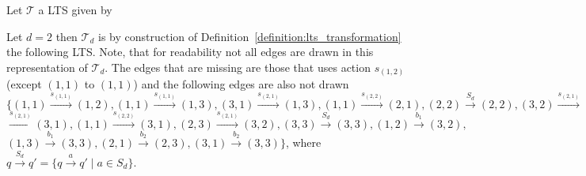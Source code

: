 \begin{example}
    Let $\mathcal{T}$ a LTS given by
    \begin{center}
    \end{center}
    Let $d = 2$ then $\mathcal{T}_d$ is by construction of Definition~\ref{definition:lts_transformation} the
    following LTS. Note, that for readability not all edges are drawn in this representation of $\mathcal{T}_d$.
    The edges that are missing are those that uses action $s_{(1, 2)}$ (except $(1, 1)$ to $(1,
    1)$) and the following edges are also not drawn
    $\{(1, 1) \overset{s_{(1, 1)}}{\rightarrow} (1, 2),
    (1, 1) \overset{s_{(1, 1)}}{\rightarrow} (1, 3),
    (3, 1) \overset{s_{(2, 1)}}{\rightarrow} (1, 3),
    (1, 1) \overset{s_{(2, 2)}}{\rightarrow} (2, 1),
    (2, 2) \overset{S_d}{\rightarrow} (2, 2),
    (3, 2) \overset{s_{(2, 1)}}{\rightarrow} (2, 3),
    (1, 3) $ $\overset{s_{(2, 1)}}{\rightarrow} (3, 1),
    (1, 1) \overset{s_{(2, 2)}}{\rightarrow} (3, 1),
    (2, 3) \overset{s_{(2, 1)}}{\rightarrow} (3, 2),
    (3, 3) \overset{S_d}{\rightarrow} (3, 3),
    (1, 2) \overset{b_1}{\rightarrow} (3, 2),
    $ $(1, 3) \overset{b_1}{\rightarrow} (3, 3),
    (2, 1) \overset{b_2}{\rightarrow} (2, 3),
    (3, 1) \overset{b_2}{\rightarrow} (3, 3)
    \}$, where $q \overset{S_d}{\rightarrow} q' =
    \{q \overset{a}{\rightarrow} q' \mid a \in S_d\}$.
    \begin{center}
\end{center}
\end{example}
